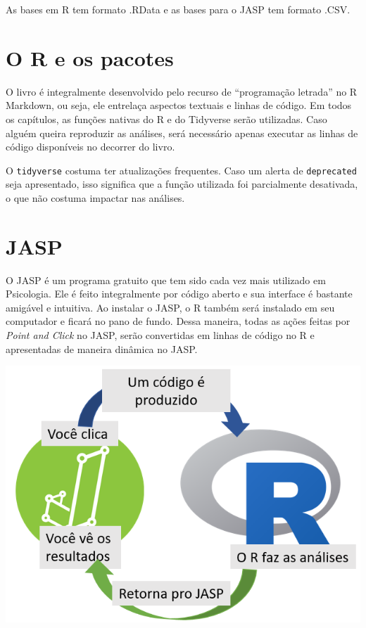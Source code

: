 \documentclass[
]{book}
\begin{document}
As bases em R tem formato .RData e as bases para o JASP tem formato .CSV.

\hypertarget{o-r-e-os-pacotes}{%
\section{O R e os pacotes}\label{o-r-e-os-pacotes}}

O livro é integralmente desenvolvido pelo recurso de ``programação letrada'' no R Markdown, ou seja, ele entrelaça aspectos textuais e linhas de código. Em todos os capítulos, as funções nativas do R e do Tidyverse serão utilizadas. Caso alguém queira reproduzir as análises, será necessário apenas executar as linhas de código disponíveis no decorrer do livro.

O \texttt{tidyverse} costuma ter atualizações frequentes. Caso um alerta de \texttt{deprecated} seja apresentado, isso significa que a função utilizada foi parcialmente desativada, o que não costuma impactar nas análises.

\hypertarget{jasp}{%
\section{JASP}\label{jasp}}

O JASP é um programa gratuito que tem sido cada vez mais utilizado em Psicologia. Ele é feito integralmente por código aberto e sua interface é bastante amigável e intuitiva. Ao instalar o JASP, o R também será instalado em seu computador e ficará no pano de fundo. Dessa maneira, todas as ações feitas por \emph{Point and Click} no JASP, serão convertidas em linhas de código no R e apresentadas de maneira dinâmica no JASP.

\includegraphics{./img/capa_r_jasp.png}
\end{document}
